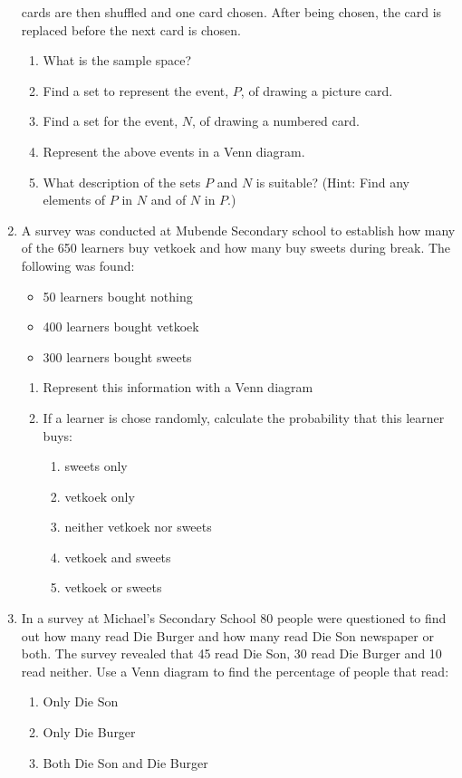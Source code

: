 \begin{eocexercises}{}
\begin{enumerate}[itemsep=5pt, label=\textbf{\arabic*}. ]
    cards are then shuffled and one card chosen. After being chosen,
    the card is replaced before the next card is chosen.
    \begin{enumerate}[noitemsep, label=\textbf{(\alph*)} ]
    \item What is the sample space?
    \item Find a set to represent the event, $P$, of drawing a picture
      card.
    \item Find a set for the event, $N$, of drawing a numbered card.
    \item Represent the above events in a Venn diagram.
    \item What description of the sets $P$ and $N$ is suitable?
      (Hint: Find any elements of $P$ in $N$ and of $N$ in $P$.)
    \end{enumerate}
\item A survey was conducted at Mubende Secondary school to establish how many of the 650 learners buy vetkoek and how many buy sweets during break. The following was found:
\begin{itemize}
 \item 50 learners bought nothing
\item 400 learners bought vetkoek
\item 300 learners bought sweets
\end{itemize}
\begin{enumerate}[noitemsep, label=\textbf{(\alph*)} ]
 \item Represent this information with a Venn diagram
\item If a learner is chose randomly, calculate the probability that this learner buys:
\begin{enumerate}[noitemsep, label=\textbf{(\roman*)} ]
 \item sweets only
\item vetkoek only
\item neither vetkoek nor sweets
\item vetkoek and sweets
\item vetkoek or sweets
\end{enumerate}
\end{enumerate}
\item In a survey at Michael's Secondary School 80 people were questioned to find out how many read Die Burger and how many read Die Son newspaper or both. The survey revealed that 45 read Die Son, 30 read Die Burger and 10 read neither. Use a Venn diagram to find the percentage of people that read:
\begin{enumerate}[noitemsep, label=\textbf{(\alph*)} ]
 \item Only Die Son
\item Only Die Burger
\item Both Die Son and Die Burger
\end{enumerate}


\end{enumerate}
\end{eocexercises}
